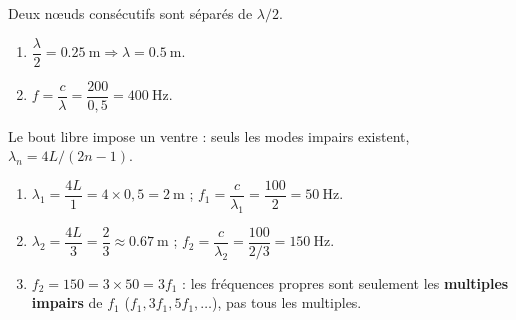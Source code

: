 \documentclass[11pt,a4paper]{article}
\begin{document}
\begin{corrige}
Deux nœuds consécutifs sont séparés de $\lambda/2$.
\begin{enumerate}[label=\alph*)]
  \item $\dfrac{\lambda}{2}=\SI{0.25}{\metre}\Rightarrow \lambda=\SI{0.5}{\metre}.$
  \item $f=\dfrac{c}{\lambda}=\dfrac{200}{0{,}5}=\SI{400}{\hertz}.$
\end{enumerate}
\end{corrige}

\begin{corrige}
Le bout libre impose un ventre : seuls les modes impairs existent, $\lambda_n=4L/(2n-1)$.
\begin{enumerate}[label=\alph*)]
  \item $\lambda_1=\dfrac{4L}{1}=4\times 0{,}5=\SI{2}{\metre}$ ;
        $f_1=\dfrac{c}{\lambda_1}=\dfrac{100}{2}=\SI{50}{\hertz}.$
  \item $\lambda_2=\dfrac{4L}{3}=\dfrac{2}{3}\approx\SI{0.67}{\metre}$ ;
        $f_2=\dfrac{c}{\lambda_2}=\dfrac{100}{2/3}=\SI{150}{\hertz}.$
  \item $f_2=150=3\times 50=3f_1$ : les fréquences propres sont seulement les
        \textbf{multiples impairs} de $f_1$ ($f_1, 3f_1, 5f_1,\dots$), pas tous les multiples.
\end{enumerate}
\end{corrige}
\end{document}
